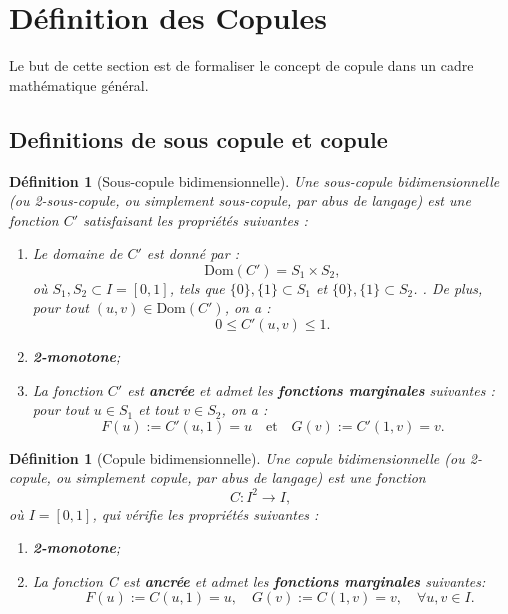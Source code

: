 \documentclass[a4paper,11pt]{amsbook}
\numberwithin{equation}{chapter}
\newtheorem{definition}	[theoreme]   {Définition}
\theoremstyle{definition}
\begin{document}
\section{Définition des Copules}

Le but de cette section est de formaliser le concept de copule dans un cadre mathématique général.

\subsection{Definitions de sous copule et copule}
\begin{definition}[Sous-copule bidimensionnelle]\label{def:sub_copule}
Une \textit{sous-copule bidimensionnelle} (ou \textit{2-sous-copule}, ou simplement \textit{sous-copule}, par abus de langage) est une fonction \( C' \) satisfaisant les propriétés suivantes :
\begin{enumerate}
    \item Le domaine de \( C' \) est donné par :
\[
\text{Dom}(C') = S_1 \times S_2,
\]
où \( S_1, S_2 \subset I = [0,1] \), tels que \( \{0\}, \{1\} \subset S_1 \) et \( \{0\}, \{1\} \subset S_2 \).  .  
De plus, pour tout \( (u,v) \in \text{Dom}(C') \), on a :
\[
0 \leq C'(u,v) \leq 1.
\]

    
    \item \textbf{2-monotone};

    \item La fonction \( C' \) est \textbf{ancrée} et admet les \textbf{fonctions marginales} suivantes : pour tout \( u \in S_1 \) et tout \( v \in S_2 \), on a :
    \[
    F(u):= C'(u,1) = u \quad \text{et} \quad G(v):= C'(1,v) = v.
    \]
\end{enumerate}
\end{definition}

\begin{definition}[Copule bidimensionnelle]\label{def:copule}
Une \textit{copule bidimensionnelle} (ou \textit{2-copule}, ou simplement \textit{copule}, par abus de langage) est une fonction 
\[
C : I^2 \to I,
\]
où \( I = [0,1] \), qui vérifie les propriétés suivantes :

\begin{enumerate}
    \item \textbf{2-monotone};
    
    \item La fonction C est \textbf{ancrée} et admet les \textbf{fonctions marginales} suivantes:
    \[
    \quad F(u):= C(u,1) = u,  \quad G(v):=C(1,v) = v, \quad \forall u,v \in I.
    \]
\end{enumerate}
\end{definition}
\end{document}
